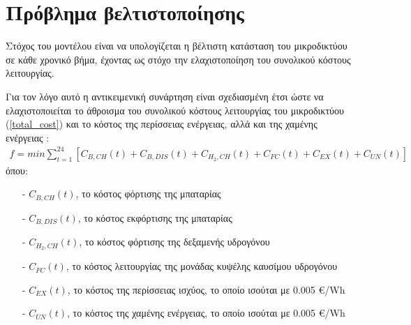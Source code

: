 \section{Πρόβλημα βελτιστοποίησης}
Στόχος του μοντέλου είναι να υπολογίζεται η βέλτιστη κατάσταση του μικροδικτύου σε κάθε χρονικό βήμα, έχοντας ως στόχο την ελαχιστοποίηση του συνολικού κόστους λειτουργίας.

Για τον λόγο αυτό η αντικειμενική συνάρτηση είναι σχεδιασμένη έτσι ώστε να ελαχιστοποιείται το άθροισμα του συνολικού κόστους λειτουργίας του μικροδικτύου (\ref{total_cost}) και το κόστος της περίσσειας ενέργειας, αλλά και της χαμένης ενέργειας \cite{CAU2014820}:
\begin{equation}
    \begin{split}
        f=min \sum_{t=1}^{24} [C_{B,CH}(t) + C_{B,DIS}(t) + C_{H_2,CH}(t) + C_{FC}(t) + C_{EX}(t) + C_{UN}(t)]
    \end{split}
\end{equation}
όπου:
\begin{itemize}
    \item[-] $C_{B,CH}(t)$, το κόστος φόρτισης της μπαταρίας
    \item[-] $C_{B,DIS}(t)$, το κόστος εκφόρτισης της μπαταρίας
    \item[-] $C_{Η_2,CH}(t)$, το κόστος φόρτισης της δεξαμενής υδρογόνου
    \item[-] $C_{FC}(t)$, το κόστος λειτουργίας της μονάδας κυψέλης καυσίμου υδρογόνου
    \item[-] $C_{EX}(t)$, το κόστος της περίσσειας ισχύος, το οποίο ισούται με 0.005 €/Wh
    \item[-] $C_{UN}(t)$, το κόστος της χαμένης ενέργειας, το οποίο ισούται με 0.005 €/Wh
\end{itemize}

